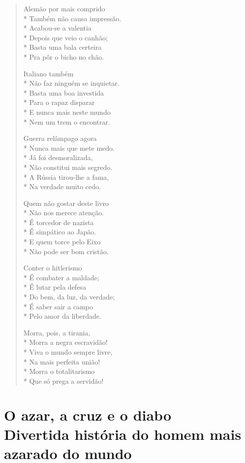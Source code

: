 \begin{verse}
Alemão por mais comprido\\*
Também não causa impressão.\\*
Acabou-se a valentia\\*
Depois que veio o canhão;\\*
Basta uma bala certeira\\*
Pra pôr o bicho no chão.

Italiano também\\*
Não faz ninguém se inquietar.\\*
Basta uma boa investida\\*
Para o rapaz disparar\\*
E nunca mais neste mundo\\*
Nem um trem o encontrar.

Guerra relâmpago agora\\*
Nunca mais que mete medo.\\*
Já foi desmoralizada,\\*
Não constitui mais segredo.\\*
A Rússia tirou-lhe a fama,\\*
Na verdade muito cedo.

Quem não gostar deste livro\\*
Não nos merece atenção.\\*
É torcedor de nazista\\*
É simpático ao Japão.\\*
E quem torce pelo Eixo\\*
Não pode ser bom cristão.

Conter o hitlerismo\\*
É combater a maldade;\\*
É lutar pela defesa\\*
Do bem, da luz, da verdade;\\*
É saber sair a campo\\*
Pelo amor da liberdade.

Morra, pois, a tirania,\\*
Morra a negra escravidão! \\*
Viva o mundo sempre livre,\\*
Na mais perfeita união!\\*
Morra o totalitarismo\\*
Que só prega a servidão!
\end{verse}

\chapter[O azar, a cruz e o diabo --- Divertida história do homem mais azarado do mundo]{O azar, a cruz e o diabo\\ Divertida história do homem mais azarado do mundo}

